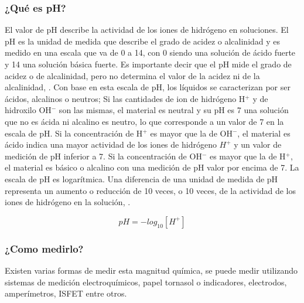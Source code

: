 \subsubsection{¿Qué es pH?}
El valor de pH describe la actividad de los iones de hidrógeno en soluciones. 
El pH es la unidad de medida que describe el grado de acidez o alcalinidad y es medido en una escala que va de 0 a 14, con 0 siendo una solución de ácido fuerte y 14 una solución básica fuerte. Es importante decir que el pH mide el grado de acidez o de alcalinidad, pero no determina el valor de la acidez ni de la alcalinidad, \cite{sierra_ramirez_calidad_2011}. 
Con base en esta escala de pH, los líquidos se caracterizan por ser ácidos, alcalinos o neutros; Si las cantidades de ion de hidr\'ogeno H$^{+}$ y de hidroxilo OH$^{-}$ son las mismas, el material es neutral y su pH es 7 una solución que no es ácida ni alcalino es neutro, lo que corresponde a un valor de 7 en la escala de pH. 
Si la concentración de H$^{+}$ es mayor que la de OH$^{-}$, el material es ácido indica una mayor actividad de los iones de hidrógeno $H^{+}$ y un valor de medición de pH inferior a 7. 
Si la concentración de OH$^{-}$ es mayor que la de H$^{+}$, el material es básico o alcalino con una medición de pH valor por encima de 7.
La escala de pH es logarítmica. Una diferencia de una unidad de medida de pH representa un aumento o reducción de 10 veces, o 10 veces, de la actividad de los iones de hidrógeno en la solución, \cite{covington_definition_1985}.

\begin{equation} \label{ecuacionpH} 
pH=-log_{10}[H^{+}]
\end{equation}

\subsubsection{¿Como medirlo?}
Existen varias formas de medir esta magnitud qu\'imica, se puede medir utilizando sistemas de medici\'on electroqu\'imicos, papel tornasol o indicadores, electrodos, amper\'imetros, ISFET entre otros. 


